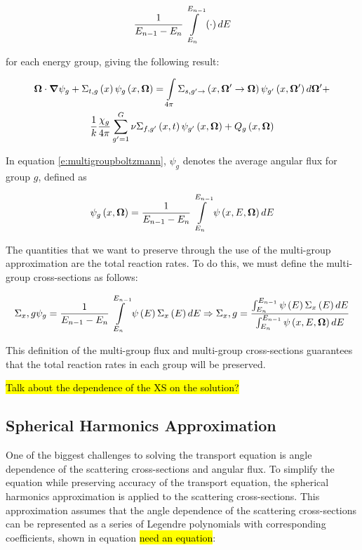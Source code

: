 \begin{equation}
\frac{1}{E_{n-1} - E_n}\intop_{E_n}^{E_{n-1}}\left(\cdot\right)dE
\end{equation}

for each energy group, giving the following result:

\begin{gather}
\bm \Omega \cdot \bm \nabla \psi_g + \Sigma_{t,g}\left(x\right)\psi_g\left(x,\bm \Omega\right) = \intop_{4\pi} \Sigma_{s,g'\rightarrow}\left(x,\bm \Omega' \rightarrow \bm \Omega\right) \psi_{g'}\left(x,\bm \Omega'\right) d\bm \Omega' + \nonumber\\
\frac{1}{k}\frac{\chi_g}{4\pi} \sum_{g'=1}^{G} \nu \Sigma_{f,g'}\left(x,t\right) \psi_{g'}\left(x,\bm \Omega\right) + Q_g\left(x,\bm \Omega\right)\label{e:multigroupboltzmann}
\end{gather}

In equation \ref{e:multigroupboltzmann}, $\psi_g$ denotes the average angular flux for group $g$, defined as

\begin{equation}\label{e:multigroupangflux}
\psi_g\left(x,\bm \Omega\right)=\frac{1}{E_{n-1}-E_n} \intop_{E_n}^{E_{n-1}} \psi\left(x,E,\bm\Omega\right) dE
\end{equation}

The quantities that we want to preserve through the use of the multi-group approximation are the total reaction rates.  To do this, we must define the multi-group cross-sections as follows:

\begin{equation}\label{e:multigroupXS}
\Sigma_x,g \psi_g = \frac{1}{E_{n-1}-E_n} \intop_{E_n}^{E_{n-1}} \psi\left(E\right) \Sigma_x\left(E\right) dE \Rightarrow \Sigma_x,g = \frac{\intop_{E_n}^{E_{n-1}} \psi\left(E\right) \Sigma_x\left(E\right) dE}{\intop_{E_n}^{E_{n-1}} \psi\left(x,E,\bm\Omega\right) dE}
\end{equation}

This definition of the multi-group flux and multi-group cross-sections guarantees that the total reaction rates in each group will be preserved.

\hl{Talk about the dependence of the XS on the solution?}

\subsection{Spherical Harmonics Approximation}

One of the biggest challenges to solving the transport equation is angle dependence of the scattering cross-sections and angular flux.  To simplify the equation while preserving accuracy of the transport equation, the spherical harmonics approximation is applied to the scattering cross-sections.  This approximation assumes that the angle dependence of the scattering cross-sections can be represented as a series of Legendre polynomials with corresponding coefficients, shown in equation \hl{need an equation}:


